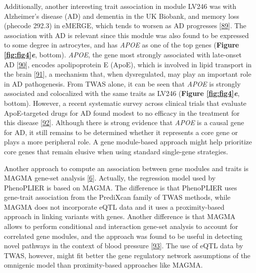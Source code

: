 Additionally, another interesting trait association in module LV246 was with Alzheimer's disease (AD) and dementia in the UK Biobank, and memory loss (phecode 292.3) in eMERGE, which tends to worsen as AD progresses {[}\protect\hyperlink{ref-Vxi0ejah}{89}{]}.
The association with AD is relevant since this module was also found to be expressed to some degree in astrocytes, and has \emph{APOE} as one of the top genes (\textbf{Figure \ref{fig:fig4}\emph{e}}, bottom).
\emph{APOE}, the gene most strongly associated with late-onset AD {[}\protect\hyperlink{ref-hn3T60wf}{90}{]}, encodes apolipoprotein E (ApoE), which is involved in lipid transport in the brain {[}\protect\hyperlink{ref-10ZgydXh1}{91}{]}, a mechanism that, when dysregulated, may play an important role in AD pathogenesis.
From TWAS alone, it can be seen that \emph{APOE} is strongly associated and colocalized with the same traits as LV246 (\textbf{Figure \ref{fig:fig4}\emph{e}}, bottom).
However, a recent systematic survey across clinical trials that evaluate ApoE-targeted drugs for AD found modest to no efficacy in the treatment for this disease {[}\protect\hyperlink{ref-UadQwQsF}{92}{]}.
Although there is strong evidence that \emph{APOE} is a causal gene for AD, it still remains to be determined whether it represents a core gene or plays a more peripheral role.
A gene module-based approach might help prioritize core genes that remain elusive when using standard single-gene strategies.

Another approach to compute an association between gene modules and traits is MAGMA gene-set analysis {[}\protect\hyperlink{ref-19XiXgYmd}{6}{]}.
Actually, the regression model used by PhenoPLIER is based on MAGMA.
The difference is that PhenoPLIER uses gene-trait association from the PrediXcan family of TWAS methods, while MAGMA does not incorporate eQTL data and it uses a proximity-based approach in linking variants with genes.
Another difference is that MAGMA allows to perform conditional and interaction gene-set analysis to account for correlated gene modules, and the approach was found to be useful in detecting novel pathways in the context of blood pressure {[}\protect\hyperlink{ref-Om8ZhS06}{93}{]}.
The use of eQTL data by TWAS, however, might fit better the gene regulatory network assumptions of the omnigenic model than proximity-based approaches like MAGMA.

